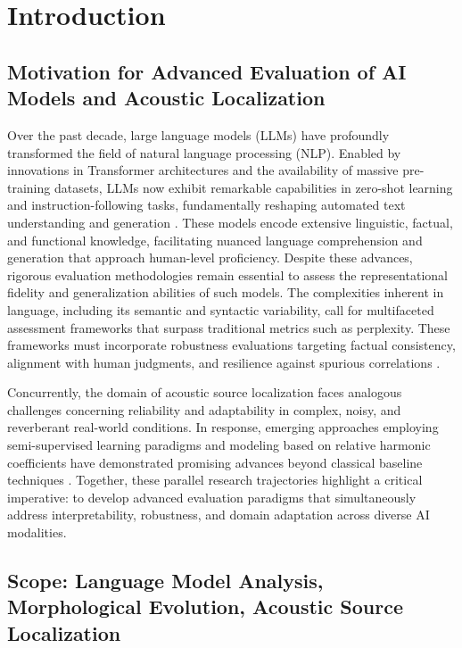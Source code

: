 \documentclass[sigconf]{acmart}
\begin{document}
\maketitle

\section{Introduction}

\subsection{Motivation for Advanced Evaluation of AI Models and Acoustic Localization}

Over the past decade, large language models (LLMs) have profoundly transformed the field of natural language processing (NLP). Enabled by innovations in Transformer architectures and the availability of massive pre-training datasets, LLMs now exhibit remarkable capabilities in zero-shot learning and instruction-following tasks, fundamentally reshaping automated text understanding and generation \cite{ref10}. These models encode extensive linguistic, factual, and functional knowledge, facilitating nuanced language comprehension and generation that approach human-level proficiency. Despite these advances, rigorous evaluation methodologies remain essential to assess the representational fidelity and generalization abilities of such models. The complexities inherent in language, including its semantic and syntactic variability, call for multifaceted assessment frameworks that surpass traditional metrics such as perplexity. These frameworks must incorporate robustness evaluations targeting factual consistency, alignment with human judgments, and resilience against spurious correlations \cite{ref1}.

Concurrently, the domain of acoustic source localization faces analogous challenges concerning reliability and adaptability in complex, noisy, and reverberant real-world conditions. In response, emerging approaches employing semi-supervised learning paradigms and modeling based on relative harmonic coefficients have demonstrated promising advances beyond classical baseline techniques \cite{ref2,ref3,ref26}. Together, these parallel research trajectories highlight a critical imperative: to develop advanced evaluation paradigms that simultaneously address interpretability, robustness, and domain adaptation across diverse AI modalities.

\subsection{Scope: Language Model Analysis, Morphological Evolution, Acoustic Source Localization}
\end{document}
